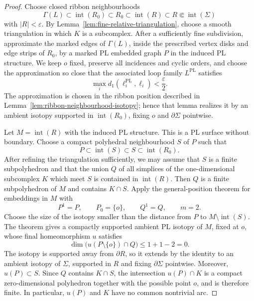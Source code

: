 \documentclass[11pt,a4paper,reqno]{article}
\theoremstyle{definition}
\theoremstyle{remark}
\begin{document}
\begin{proof}
Choose closed ribbon neighbourhoods
\[
 \Gamma(L)\subset\operatorname{int}(R_0)
 \subset R_0\subset\operatorname{int}(R)
 \subset R\Subset\operatorname{int}(\Sigma)
\]
with $|R|<\varepsilon$. By Lemma~\ref{lem:fine-relative-triangulation}, choose a smooth triangulation in which $K$ is a subcomplex. After a sufficiently fine subdivision, approximate the marked edges of $\Gamma(L)$, inside the prescribed vertex disks and edge strips of $R_0$, by a marked PL embedded graph $P$ in the induced PL structure. We keep $o$ fixed, preserve all incidences and cyclic orders, and choose the approximation so close that the associated loop family $L^{\mathrm{PL}}$ satisfies
\[
 \max_i d_1(\ell_i^{\mathrm{PL}},\ell_i)<\frac{\varepsilon}{2}.
\]
The approximation is chosen in the ribbon position described in Lemma~\ref{lem:ribbon-neighbourhood-isotopy}; hence that lemma realizes it by an ambient isotopy supported in $\operatorname{int}(R_0)$, fixing $o$ and $\partial\Sigma$ pointwise.

Let $M=\operatorname{int}(R)$ with the induced PL structure. This is a PL surface without boundary. Choose a compact polyhedral neighbourhood $S$ of $P$ such that
\[
 P\subset\operatorname{int}(S)\subset S\subset\operatorname{int}(R_0).
\]
After refining the triangulation sufficiently, we may assume that $S$ is a finite subpolyhedron and that the union $Q$ of all simplices of the one-dimensional subcomplex $K$ which meet $S$ is contained in $\operatorname{int}(R)$. Then $Q$ is a finite subpolyhedron of $M$ and contains $K\cap S$.
Apply the general-position theorem for embeddings \cite[Theorem~5.3]{RourkeSandersonPL} in $M$ with
\[
 P^1=P,\qquad P_0=\{o\},\qquad Q^1=Q,
 \qquad m=2.
\]
Choose the size of the isotopy smaller than the distance from $P$ to $M\setminus\operatorname{int}(S)$. The theorem gives a compactly supported ambient PL isotopy of $M$, fixed at $o$, whose final homeomorphism $u$ satisfies
\[
 \dim\bigl(u(P\setminus\{o\})\cap Q\bigr)\le 1+1-2=0.
\]
The isotopy is supported away from $\partial R$, so it extends by the identity to an ambient isotopy of $\Sigma$, supported in $R$ and fixing $\partial\Sigma$ pointwise. Moreover, $u(P)\subset S$. Since $Q$ contains $K\cap S$, the intersection $u(P)\cap K$ is a compact zero-dimensional polyhedron together with the possible point $o$, and is therefore finite. In particular, $u(P)$ and $K$ have no common nontrivial arc.


\end{proof}
\end{document}
